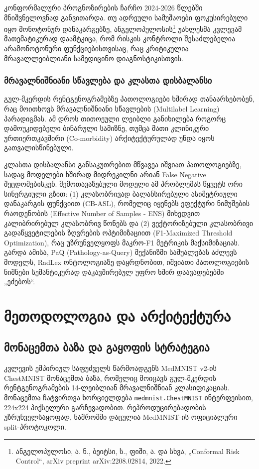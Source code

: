 \documentclass[12pt,a4paper,oneside]{report}
\begin{document}
კონფორმალური პროგნოზირების ჩარჩო 2024-2026 წლებში მნიშვნელოვნად განვითარდა. თუ ადრეული სამუშაოები ფოკუსირებული იყო მონოტონურ დანაკარგებზე, ანგელოპულოსის\footnote{ანგელოპულოსი, ა. ნ., ბეიტსი, ს., ფიში, ა. და სხვა, „Conformal Risk Control“, arXiv preprint arXiv:2208.02814, 2022.} უახლესმა კვლევამ მათემატიკურად დაამტკიცა, რომ რისკის კონტროლი შესაძლებელია არამონოტონური ფუნქციებისთვისაც, რაც კრიტიკულია მრავალლეიბლიანი სამედიცინო დიაგნოსტიკისთვის.

\subsection{მრავალნიშნიანი სწავლება და კლასთა დისბალანსი}
გულ-მკერდის რენტგენოგრამებზე პათოლოგიები ხშირად თანაარსებობენ, რაც მოითხოვს მრავალნიშნიანი სწავლების (Multilabel Learning) პარადიგმას. ამ დროს თითოეული ლეიბლი განიხილება როგორც დამოუკიდებელი ბინარული სამიზნე, თუმცა მათი კლინიკური ურთიერთკავშირი (Co-morbidity) არქიტექტურულად უნდა იყოს გათვალისწინებული.

კლასთა დისბალანსი განსაკუთრებით მწვავეა იშვიათ პათოლოგიებზე, სადაც მოდელები ხშირად მიდრეკილნი არიან False Negative შეცდომებისკენ. შემოთავაზებული მოდელი ამ პრობლემას წყვეტს ორი სინერგიული გზით: (1) კლასობრივად ბალანსირებული ასიმეტრიული დანაკარგის ფუნქციით (CB-ASL), რომელიც იყენებს ეფექტური ნიმუშების რაოდენობის (Effective Number of Samples - ENS) მიხედვით კალიბრირებულ კლასობრივ წონებს და (2) ვექტორიზებული კლასობრივი გადაწყვეტილების ზღვრების ოპტიმიზაციით (F1-Maximized Threshold Optimization), რაც უზრუნველყოფს მაკრო-F1 მეტრიკის მაქსიმიზაციას. გარდა ამისა, PaQ (Pathology-as-Query) მექანიზმი საშუალებას აძლევს მოდელს, RadLex ონტოლოგიაზე დაყრდნობით, იშვიათი პათოლოგიების ნიშნები სემანტიკურად დაკავშირებულ უფრო ხშირ დაავადებებში „ეძებოს“.

\chapter{მეთოდოლოგია და არქიტექტურა}

\section{მონაცემთა ბაზა და გაყოფის სტრატეგია}
კვლევის ემპირიულ საფუძველს წარმოადგენს MedMNIST v2-ის ChestMNIST მონაცემთა ბაზა, რომელიც მოიცავს გულ-მკერდის რენტგენოგრამების 14-ლეიბლიან მრავალნიშნიან კლასიფიკაციას. მონაცემთა ჩატვირთვა ხორციელდება \texttt{medmnist.ChestMNIST} ინტერფეისით, 224x224 პიქსელური გარჩევადობით. რეპროდუცირებადობის უზრუნველსაყოფად, ნაშრომში დაცულია MedMNIST-ის ოფიციალური split-პროტოკოლი.
\end{document}
